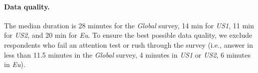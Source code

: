 \begin{small}
\paragraph{\small Data quality.} %
The median duration is 28 minutes for the \textit{Global} survey, 14 min for \textit{US1}, 11 min for \textit{US2}, and 20 min for \textit{Eu}. To ensure the best possible data quality, we exclude respondents who fail an attention test or rush through the survey (i.e., answer in less than 11.5 minutes in the \textit{Global} survey, 4 minutes in \textit{US1} or \textit{US2}, 6 minutes in \textit{Eu}). %




\end{small}
